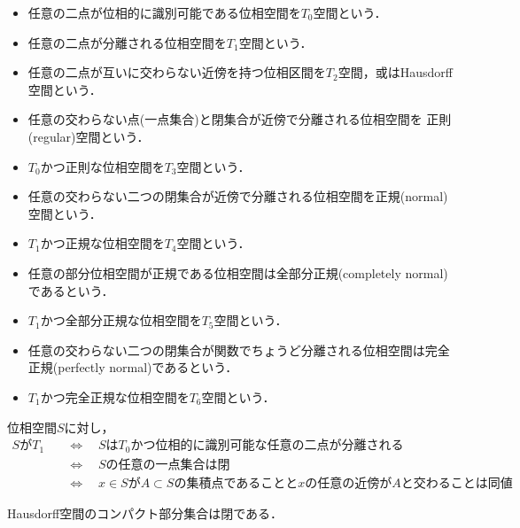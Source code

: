 	\begin{screen}
		\begin{dfn}[分離公理]\mbox{}
			\begin{itemize}
				\item 任意の二点が位相的に識別可能である位相空間を$T_0$空間という．
				\item 任意の二点が分離される位相空間を$T_1$空間という．
				\item 任意の二点が互いに交わらない近傍を持つ位相区間を$T_2$空間，或はHausdorff空間という．
				\item 任意の交わらない点(一点集合)と閉集合が近傍で分離される位相空間を
					正則(regular)空間という．
				\item $T_0$かつ正則な位相空間を$T_3$空間という．
				\item 任意の交わらない二つの閉集合が近傍で分離される位相空間を正規(normal)空間という．
				\item $T_1$かつ正規な位相空間を$T_4$空間という．
				\item 任意の部分位相空間が正規である位相空間は全部分正規(completely normal)であるという．
				\item $T_1$かつ全部分正規な位相空間を$T_5$空間という．
				\item 任意の交わらない二つの閉集合が関数でちょうど分離される位相空間は完全正規(perfectly normal)であるという．
				\item $T_1$かつ完全正規な位相空間を$T_6$空間という．
			\end{itemize}
		\end{dfn}
	\end{screen}
	
	\begin{screen}
		\begin{thm}[$T_1$の同値条件]
			位相空間$S$に対し，
			\begin{align}
				\mbox{$S$が$T_1$}
				&\quad \Longleftrightarrow \quad \mbox{$S$は$T_0$かつ位相的に識別可能な任意の二点が分離される} \\
				&\quad \Longleftrightarrow \quad \mbox{$S$の任意の一点集合は閉} \\
				&\quad \Longleftrightarrow \quad \mbox{$x \in S$が$A \subset S$の集積点であることと$x$の任意の近傍が$A$と交わることは同値}.
			\end{align}
		\end{thm}
	\end{screen}
	
	\begin{screen}
		\begin{thm}[Hausdorff空間のコンパクト部分集合は閉]
			Hausdorff空間のコンパクト部分集合は閉である．
		\end{thm}
	\end{screen}
	
